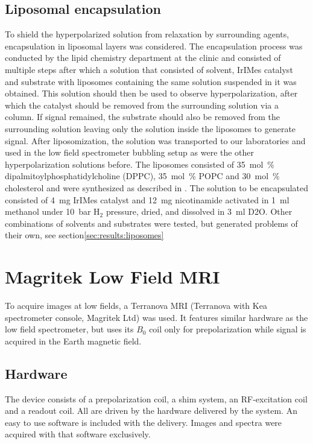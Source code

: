         \subsection{Liposomal encapsulation}
        \label{sec:matMeth:liposomes}
    To shield the hyperpolarized solution from relaxation by surrounding agents, encapsulation in liposomal layers was considered. The encapsulation process was conducted by the lipid chemistry department at the clinic and consisted of multiple steps after which a solution that consisted of solvent, IrIMes catalyst and substrate with liposomes containing the same solution suspended in it was obtained. This solution should then be used to observe hyperpolarization, after which the catalyst should be removed from the surrounding solution via a column. If signal remained, the substrate should also be removed from the surrounding solution leaving only the solution inside the liposomes to generate signal. After liposomization, the solution was transported to our laboratories and used in the low field spectrometer bubbling setup as were the other hyperpolarization solutions before.
    The liposomes consisted of \SI{35}{\mole\percent} dipalmitoylphosphatidylcholine (DPPC), \SI{35}{\mole\percent} POPC and \SI{30}{\mole\percent} cholesterol and were synthesized as described in \cite{putz_synthesis_2005}. The solution to be encapsulated consisted of \SI{4}{\milli\g} IrIMes catalyst and \SI{12}{\milli\g} nicotinamide activated in \SI{1}{\milli\l} methanol under \SI{10}{\bar} H$_2$ pressure, dried, and dissolved in \SI{3}{\milli\l} D2O. Other combinations of solvents and substrates were tested, but generated problems of their own, see section\ref{sec:results:liposomes}
    \section{Magritek Low Field MRI}
    \label{sec:matMeth:magritek}
    To acquire images at low fields, a Terranova MRI (Terranova with Kea spectrometer console, Magritek Ltd) was used. It features similar hardware as the low field spectrometer, but uses its $B_0$ coil only for prepolarization while signal is acquired in the Earth magnetic field.
        \subsection{Hardware}
            The device consists of a prepolarization coil, a shim system, an RF-excitation coil and a readout coil. All are driven by the hardware delivered by the system. An easy to use software is included with the delivery. Images and spectra were acquired with that software exclusively.
